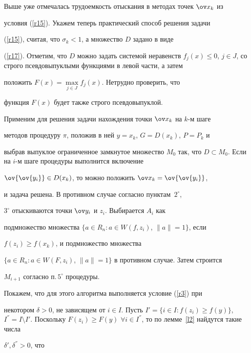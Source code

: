 Выше уже отмечалась трудоемкость отыскания в методах точек $\ov x_k$ из


условия (\ref{r15}). Укажем теперь практический способ решения задачи


(\ref{r15}), считая, что $\sigma_k <1$, а множество $D$ задано в виде


(\ref{r17}). Отметим, что $D$ можно задать системой неравенств $f_j(x)\le


0$, $j\in J$, со строго псевдовыпуклыми функциями в левой части, а затем


положить $F(x)=\max \limits_{j\in J} f_j(x)$. Нетрудно проверить, что


функция $F(x)$ будет также строго псевдовыпуклой.





Применим для решения задачи нахождения точки $\ov x_k$ на $k$-м шаге


методов процедуру $\pi$, положив в ней $y=x_k$, $G=D(x_k)$, $P=P_k$ и


выбрав выпуклое ограниченное замкнутое множество $M_0$ так, что $D\subset


M_0$. Если на $i$-м шаге процедуры выполнится включение


$\ov{\ov{y_i}}\in D(x_k)$, то можно положить $\ov x_k=\ov{\ov{y_i}}$,


и задача решена. В противном случае согласно пунктам~$2^{\circ}$,


$3^{\circ}$ отыскиваются точки $\ov y_i$ и $z_i$. Выбирается $A_i$ как


подмножество множества $\{ a\in R_n: a\in W(f,z_i)$, $\|a\|=1\}$, если


$f(z_i)\ge f(x_k)$, и подмножество множества


$\{a\in R_n: a\in W(F,z_i)$, $\|a\|=1\}$ в противном случае. Затем строится


$M_{i+1}$ согласно п.\,$5^{\circ}$ процедуры.





Покажем, что для этого алгоритма выполняется условие (\ref{r3}) при


некотором $\delta>0$, не зависящем от $i\in I$. Пусть $I'= \{i\in I: f(z_i)


\ge f(y)\}$, $I^{''}=I\setminus I'$. Поскольку $F(z_i)\ge F(y)$ $\forall


i\in I^{''}$, то по лемме~\ref{l2} найдутся такие числа


$\delta', \delta^{''}>0$, что


